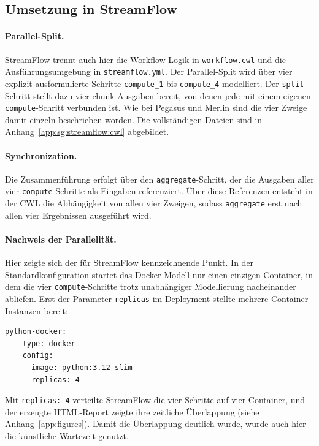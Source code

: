 \subsection{Umsetzung in StreamFlow}
\label{sec:practical:scattergather:streamflow}

\paragraph{Parallel-Split.}
StreamFlow trennt auch hier die Workflow-Logik in \texttt{workflow.cwl} und die Ausführungsumgebung
in \texttt{streamflow.yml}. Der Parallel-Split wird über vier explizit ausformulierte Schritte
\texttt{compute\_1} bis \texttt{compute\_4} modelliert. Der \texttt{split}-Schritt stellt dazu vier
chunk Ausgaben bereit, von denen jede mit einem eigenen \texttt{compute}-Schritt verbunden ist.
Wie bei Pegasus und Merlin sind die vier Zweige damit einzeln beschrieben worden. Die
vollständigen Dateien sind in Anhang~\ref{app:sg:streamflow:cwl} abgebildet.

\paragraph{Synchronization.}
Die Zusammenführung erfolgt über den \texttt{aggregate}-Schritt, der die Ausgaben aller vier
\texttt{compute}-Schritte als Eingaben referenziert. Über diese Referenzen entsteht in der CWL die
Abhängigkeit von allen vier Zweigen, sodass \texttt{aggregate} erst nach allen vier Ergebnissen
ausgeführt wird.

\paragraph{Nachweis der Parallelität.}
Hier zeigte sich der für StreamFlow kennzeichnende Punkt. In der Standardkonfiguration startet das
Docker-Modell nur einen einzigen Container, in dem die vier \texttt{compute}-Schritte trotz
unabhängiger Modellierung nacheinander abliefen. Erst der Parameter \texttt{replicas} im Deployment
stellte mehrere Container-Instanzen bereit:

\begin{lstlisting}[caption={replicas im Deployment (StreamFlow, Scatter-Gather)},label={lst:sg:sf:replicas}]
  python-docker:
    type: docker
    config:
      image: python:3.12-slim
      replicas: 4
\end{lstlisting}

Mit \texttt{replicas: 4} verteilte StreamFlow die vier Schritte auf vier Container, und der erzeugte
HTML-Report zeigte ihre zeitliche Überlappung (siehe Anhang~\ref{app:figures}). Damit die
Überlappung deutlich wurde, wurde auch hier die künstliche Wartezeit genutzt.

